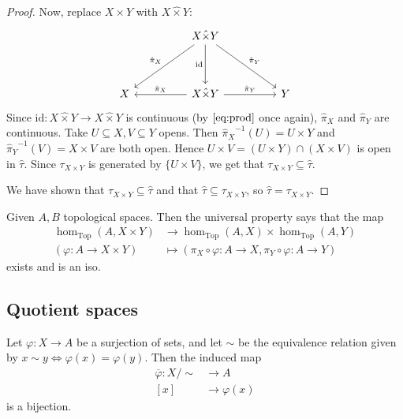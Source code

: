 \begin{proof}
  Now, replace \( X \times Y \) with \( X \hat{\times} Y \):
\[\begin{tikzcd}
	&& {X \hat{\times} Y} \\
	\\
	X && {X \hat{\times} Y} && Y
	\arrow["{\hat{\pi}_X}"', from=1-3, to=3-1]
	\arrow["{\text{id}}"', from=1-3, to=3-3]
	\arrow["{\hat{\pi}_Y}", from=1-3, to=3-5]
	\arrow["{\hat{\pi}_X}"', from=3-3, to=3-1]
	\arrow["{\hat{\pi}_Y}", from=3-3, to=3-5]
\end{tikzcd}\]
Since \( \text{id}:  X \hat{\times} Y  \to  X \hat{\times} Y  \)
is continuous (by \( \eqref{eq:prod} \) once again),
\( \hat{\pi}_X \) and \( \hat{\pi}_Y \) are continuous.
Take \( U \subseteq X, V \subseteq Y \) opens. Then
\( {\hat{\pi}_X}^{-1}(U) = U \times Y  \) and
\( {\hat{\pi}_Y}^{-1}(V) = X \times V  \) are
both open. Hence
\( U \times V = (U \times Y) \cap (X \times V) \)
is open in \( \hat{\tau} \). Since \( \tau_{X \times Y} \)
is generated by \( \{ U \times V \}  \), we get that
\( \tau_{X \times Y} \subseteq \hat{\tau} \).

We have shown that 
\( \tau_{X \times Y} \subseteq \hat{\tau} \)
and that 
\( \hat{\tau} \subseteq \tau_{X \times Y}\), 
so 
\( \hat{\tau} = \tau_{X \times Y}\).
\end{proof}

\begin{corollary}
   Given \( A, B \) topological spaces.
   Then the universal property says that the map
   \begin{align*}
     \hom_\text{Top} (A, X \times Y) &\longrightarrow \hom_\text{Top} (A, X) \times \hom_\text{Top} (A, Y) \\
     (\varphi : A \to X \times Y) &\longmapsto (\pi_X \circ \varphi : A \to X, \pi_Y \circ \varphi : A \to Y)
  \end{align*}
  exists and is an iso.
\end{corollary}

\subsection{Quotient spaces}

\begin{lemma}
    Let \( \varphi: X \to A \) be a surjection of sets,
    and let \( \sim \) be the equivalence relation given
    by \( x \sim y \iff \varphi(x) = \varphi(y) \).
    Then the induced map 
    \begin{align*}
      \overline{\varphi}: X / \sim &\to A \\
      [x] &\to \varphi(x)
    \end{align*}
    is a bijection.
\end{lemma}

